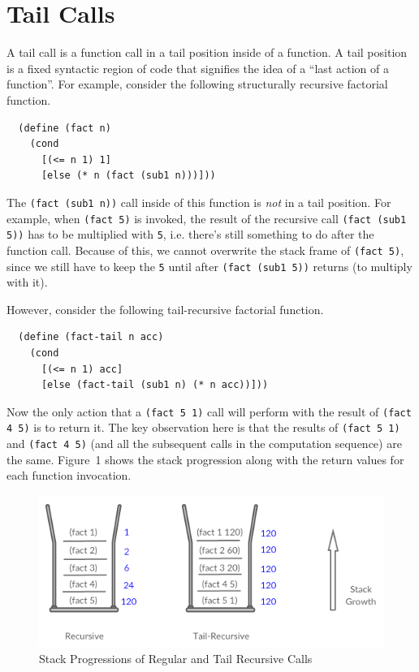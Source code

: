 \documentclass[12pt]{article}
\begin{document}
\section{Tail Calls}

A tail call is a function call in a tail position inside of a
function. A tail position is a fixed syntactic region of code that
signifies the idea of a ``last action of a function''. For example,
consider the following structurally recursive factorial function.

\begin{verbatim}
  (define (fact n)
    (cond
      [(<= n 1) 1]
      [else (* n (fact (sub1 n)))]))
\end{verbatim}

The \verb+(fact (sub1 n))+ call inside of this function is \emph{not} in
a tail position. For example, when \verb+(fact 5)+ is invoked, the result of
the recursive call \verb+(fact (sub1 5))+ has to be multiplied with \verb+5+,
i.e. there's still something to do after the function
call. Because of this, we cannot overwrite the stack frame of \verb+(fact 5)+,
since we still have to keep the \verb+5+ until after \verb+(fact (sub1 5))+
returns (to multiply with it).

However, consider the following tail-recursive factorial function.

\begin{verbatim}
  (define (fact-tail n acc)
    (cond
      [(<= n 1) acc]
      [else (fact-tail (sub1 n) (* n acc))]))
\end{verbatim}

Now the only action that a \verb+(fact 5 1)+ call will perform with the
result of \verb+(fact 4 5)+ is to return it. The key observation here is
that the results of \verb+(fact 5 1)+ and \verb+(fact 4 5)+ (and all the
subsequent calls in the computation sequence) are the same. Figure~1
shows the stack progression along with the return values for each function
invocation.

\begin{figure}[htb!]
  \centering
  \includegraphics[scale=0.5]{stack.png}
  \caption{Stack Progressions of Regular and Tail Recursive Calls}
\end{figure}
\end{document}
